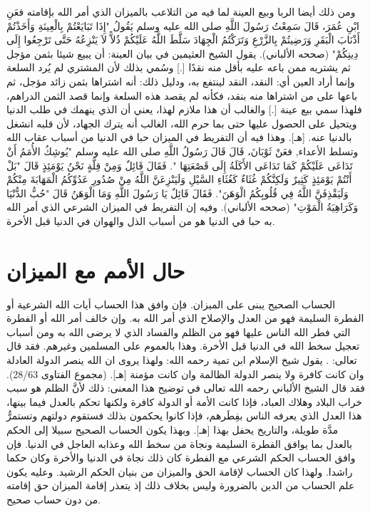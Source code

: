 ومن ذلك أيضا الربا وبيع العينة لما فيه من التلاعب بالميزان الذي أمر الله بإقامته فعَنِ ابْنِ عُمَرَ، قَالَ سَمِعْتُ رَسُولَ اللَّهِ صلى الله عليه وسلم يَقُولُ "إِذَا تَبَايَعْتُمْ بِالْعِينَةِ وَأَخَذْتُمْ أَذْنَابَ الْبَقَرِ وَرَضِيتُمْ بِالزَّرْعِ وَتَرَكْتُمُ الْجِهَادَ سَلَّطَ اللَّهُ عَلَيْكُمْ ذُلاًّ لاَ يَنْزِعُهُ حَتَّى تَرْجِعُوا إِلَى دِينِكُمْ" {\footnotesize (صححه الألباني)}. يقول الشيخ العثيمين في بيان العينة:
أن يبيع شيئا بثمن مؤجل ثم يشتريه ممن باعه عليه بأقل منه نقدًا [.] وسُمي بذلك لأن المشتري لم يُرد السلعة وإنما أراد العين أي: النقد، النقد لينتفع به، ودليل ذلك: أنه اشتراها بثمن زائد مؤجل، ثم باعها على من اشتراها منه بنقد، فكأنه لم يقصد هذه السلعة وإنما قصد الثمن الدراهم، فلهذا سمي بيع عينة [.] والغالب أن هذا ملازم لهذا، يعني أن الذي ينهمك في طلب الدنيا ويتحيل على الحصول عليها حتى بما حرم الله، الغالب أنه يترك الجهاد، لأن قلبه انشغل بالدنيا عنه.
[هـ]. وهذا فيه أن التفريط في الميزان حبا في الدنيا من أسباب عقاب الله وتسلط الأعداء, فعَنْ ثَوْبَانَ، قَالَ قَالَ رَسُولُ اللَّهِ صلى الله عليه وسلم "يُوشِكُ الأُمَمُ أَنْ تَدَاعَى عَلَيْكُمْ كَمَا تَدَاعَى الأَكَلَةُ إِلَى قَصْعَتِهَا ". فَقَالَ قَائِلٌ وَمِنْ قِلَّةٍ نَحْنُ يَوْمَئِذٍ قَالَ "بَلْ أَنْتُمْ يَوْمَئِذٍ كَثِيرٌ وَلَكِنَّكُمْ غُثَاءٌ كَغُثَاءِ السَّيْلِ وَلَيَنْزِعَنَّ اللَّهُ مِنْ صُدُورِ عَدُوِّكُمُ الْمَهَابَةَ مِنْكُمْ وَلَيَقْذِفَنَّ اللَّهُ فِي قُلُوبِكُمُ الْوَهَنَ". فَقَالَ قَائِلٌ يَا رَسُولَ اللَّهِ وَمَا الْوَهَنُ قَالَ "حُبُّ الدُّنْيَا وَكَرَاهِيَةُ الْمَوْتِ" {\footnotesize (صححه الألباني)}. وفيه إن التفريط في الميزان الشرعي الذي أمر الله به حبا في الدنيا هو من أسباب الذل والهوان في الدنيا قبل الأخرة.

\section{حال الأمم مع الميزان}

الحساب الصحيح يبنى على الميزان. فإن وافق هذا الحساب أيات الله الشرعية أو الفطرة السليمة فهو من العدل والإصلاح الذي أمر الله به. وإن خالف أمر الله أو الفطرة التي فطر الله الناس عليها فهو من الظلم والفساد الذي لا يرضى الله به ومن أسباب تعجيل سخط الله في الدنيا قبل الأخرة. وهذا بالعموم على المسلمين وغيرهم. فقد قال تعالى:
\quranayah*[11][117]{\footnotesize \surahname*[11]}.
يقول شيخ الإسلام ابن تمية رحمه الله:
ولهذا يروى ان الله ينصر الدولة العادلة وان كانت كافرة ولا ينصر الدولة الظالمة وان كانت مؤمنة
[هـ].
{\footnotesize (مجموع الفتاوى 28/63)}.
فقد قال الشيخ الألباني رحمه الله تعالى في توضيح هذا المعنى:
ذلك لأنَّ الظلم هو سبب خراب البلاد وهلاك العباد، فإذا كانت الأمة أو الدولة كافرة ولكنها تحكم بالعدل فيما بينها، هذا العدل الذي يعرفه الناس بفِطَرهم، فإذا كانوا يحكمون بذلك فستقوم دولتهم وتستمرُّ مدَّة طويلة، والتاريخ يحفل بهذا
[هـ].
وبهذا يكون الحساب الصحيح سبيلا إلى الحكم بالعدل بما يوافق الفطرة السليمة ونجاة من سخط الله وعذابه العاجل في الدنيا. فإن وافق الحساب الحكم الشرعي مع الفطرة كان ذلك نجاة في الدنيا والأخرة وكان حكما راشدا. ولهذا كان الحساب لإقامة الحق والميزان من بنيان الحكم الرشيد. وعليه يكون علم الحساب من الدين بالضرورة وليس بخلاف ذلك إذ يتعذر إقامة الميزان حق إقامته من دون حساب صحيح.

